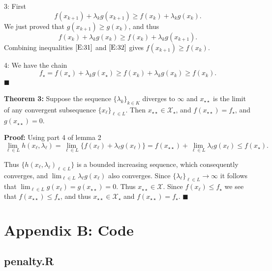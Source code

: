 \documentclass[
  12pt,
]{article}
\begin{document}
3: First \begin{equation}\label{E:31}
f(x_{k+1})+\lambda_k g(x_{k+1})\geq f(x_k)+\lambda_k g(x_k).
\end{equation} We just proved that \(g(x_{k+1})\geq g(x_k)\), and thus
\begin{equation}\label{E:32}
f(x_k)+\lambda_k g(x_k)\geq f(x_k)+\lambda_k g(x_{k+1}).
\end{equation} Combining inequalities \(\eqref{E:31}\) and
\(\eqref{E:32}\) gives \(f(x_{k+1})\geq f(x_k)\).

4: We have the chain \[
f_\star=f(x_\star)+\lambda_k g(x_\star)\geq f(x_k)+\lambda_k g(x_k)\geq f(x_k).
\] \(\blacksquare\)

\textbf{Theorem 3: } Suppose the sequence \(\{\lambda_k\}_{k\in K}\)
diverges to \(\infty\) and \(x_{\star\star}\) is the limit of any
convergent subsequence \(\{x_\ell\}_{\ell\in L}\). Then
\(x_{\star\star}\in\mathcal{X}_\star\), and
\(f(x_{\star\star})=f_\star\), and \(g(x_{\star\star})=0\).

\textbf{Proof:} Using part 4 of lemma 2 \[
\lim_{\ell\in L}h(x_\ell,\lambda_\ell)=\lim_{\ell\in L}\{f(x_\ell)+\lambda_\ell g(x_\ell)\}=f(x_{\star\star})+\lim_{\ell\in L}\lambda_\ell g(x_\ell)\leq f(x_\star).
\]

Thus \(\{h(x_\ell,\lambda_\ell)_{\ell\in L}\}\) is a bounded increasing
sequence, which consequently converges, and
\(\lim_{\ell\in L}\lambda_\ell g(x_\ell)\) also converges. Since
\(\{\lambda_\ell\}_{\ell\in L}\rightarrow\infty\) it follows that
\(\lim_{\ell\in L}g(x_\ell)=g(x_{\star\star})=0\). Thus
\(x_{\star\star}\in\mathcal{X}\). Since \(f(x_\ell)\leq f_\star\) we see
that \(f(x_{\star\star})\leq f_\star\), and thus
\(x_{\star\star}\in\mathcal{X}_\star\) and
\(f(x_{\star\star})=f_\star\). \(\blacksquare\)

\section{Appendix B: Code}\label{appendix-b-code}

\subsection{penalty.R}\label{penalty.r}
\end{document}
